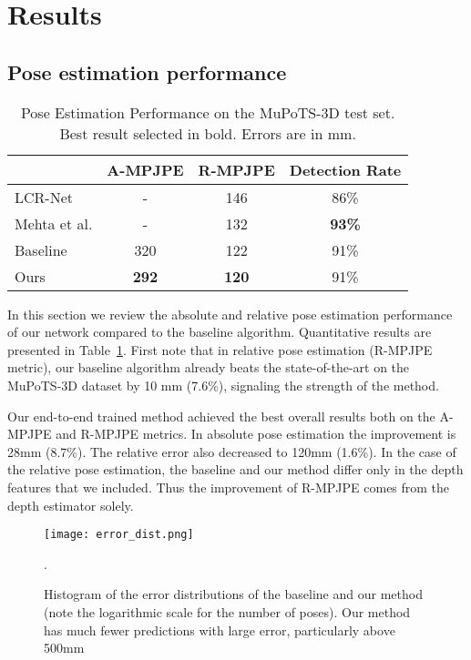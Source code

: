 \documentclass[conference]{IEEEtran}
\begin{document}
\section{Results}\label{sec:results}

\subsection{Pose estimation performance}
\begin{table}[htb]
\caption{Pose Estimation Performance on the MuPoTS-3D test set. Best result selected in bold. Errors are in mm. }
\begin{center}
\begin{tabular}{lccc}
 & A-MPJPE & R-MPJPE & Detection Rate \\
\hline
LCR-Net \cite{rogez2017lcrnet} & - & 146 & 86\% \\
Mehta et al. \cite{mehta2018single_shot} & - & 132 & \textbf{93\%}  \\
\hline
Baseline & 320 & 122 & 91\%  \\
Ours  & \textbf{292} & \textbf{120} & 91\%  \\
\hline
\end{tabular}
\label{tab:pose-perf}
\end{center}
\end{table}
In this section we review the absolute and relative pose estimation performance of our network compared to the baseline algorithm. Quantitative results are presented in Table~\ref{tab:pose-perf}. First note that in relative pose estimation (R-MPJPE metric), our baseline algorithm already beats the state-of-the-art on the MuPoTS-3D dataset by 10 mm (7.6\%), signaling the strength of the method.

Our end-to-end trained method achieved the best overall results both on the A-MPJPE and R-MPJPE metrics. In absolute pose estimation the improvement is 28mm (8.7\%). The relative error also decreased to 120mm (1.6\%). In the case of the relative pose estimation, the baseline and our method differ only in the depth features that we included. Thus the improvement of R-MPJPE comes from the depth estimator solely.

\begin{figure}
\centering
\texttt{[image: error\_dist.png]}
\caption{Histogram of the error distributions of the baseline and our method (note the logarithmic scale for the number of poses). Our method has much fewer predictions with large error, particularly above 500mm}.
\label{fig:err_dist}
\end{figure}
\end{document}
